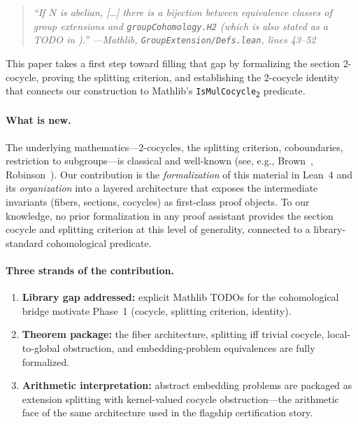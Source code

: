 \documentclass[11pt]{article}
\newcommand{\lean}[1]{\texttt{#1}}
\newcommand{\IsMulCocycle}{\lean{IsMulCocycle\textsubscript{2}}}
\begin{document}
\begin{quote}
\itshape
``If $N$ is abelian, [\ldots] there is a bijection between equivalence classes of
group extensions and \lean{groupCohomology.H2} (which is also stated as a TODO in\linebreak
{}).''
\hfill---\textup{Mathlib, \lean{GroupExtension/Defs.lean}, lines 43--52}
\end{quote}

\noindent
This paper takes a first step toward filling that gap by formalizing the section
2-cocycle, proving the splitting criterion, and establishing the 2-cocycle identity
that connects our construction to Mathlib's \IsMulCocycle{} predicate.

\paragraph{What is new.}
The underlying mathematics---2-cocycles, the splitting criterion, coboundaries,
restriction to subgroups---is classical and well-known
(see, e.g., Brown~\cite{Brown1982}, Robinson~\cite{Robinson1996}).  Our
contribution is the \emph{formalization} of this material in Lean~4 and its
\emph{organization} into a layered architecture that exposes the intermediate
invariants (fibers, sections, cocycles) as first-class proof objects.  To our
knowledge, no prior formalization in any proof assistant provides the section
cocycle and splitting criterion at this level of generality, connected to a
library-standard cohomological predicate.

\paragraph{Three strands of the contribution.}
\begin{enumerate}[label=(\arabic*), leftmargin=2em]
  \item \textbf{Library gap addressed:} explicit Mathlib TODOs for the cohomological bridge
    motivate Phase~1 (cocycle, splitting criterion, identity).
  \item \textbf{Theorem package:} the fiber architecture, splitting iff trivial cocycle,
    local-to-global obstruction, and embedding-problem equivalences are fully formalized.
  \item \textbf{Arithmetic interpretation:} abstract embedding problems are packaged as
    extension splitting with kernel-valued cocycle obstruction---the arithmetic face of the
    same architecture used in the flagship certification story.
\end{enumerate}
\end{document}
